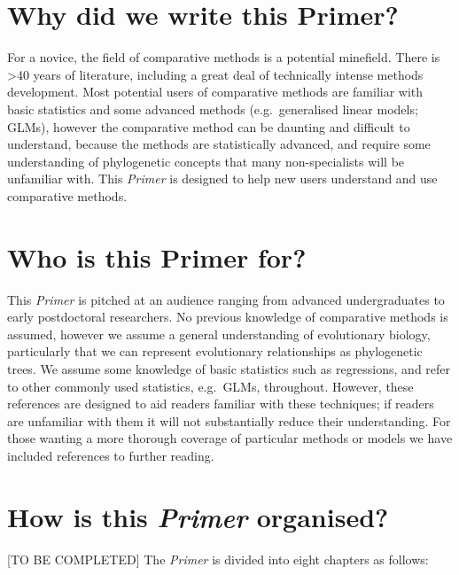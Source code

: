 \documentclass[]{book}
\begin{document}
\section*{Why did we write this
Primer?}\label{why-did-we-write-this-primer}

For a novice, the field of comparative methods is a potential minefield.
There is \textgreater{}40 years of literature, including a great deal of
technically intense methods development. Most potential users of
comparative methods are familiar with basic statistics and some advanced
methods (e.g.~generalised linear models; GLMs), however the comparative
method can be daunting and difficult to understand, because the methods
are statistically advanced, and require some understanding of
phylogenetic concepts that many non-specialists will be unfamiliar with.
This \emph{Primer} is designed to help new users understand and use
comparative methods.

\section*{Who is this Primer for?}\label{who-is-this-primer-for}

This \emph{Primer} is pitched at an audience ranging from advanced
undergraduates to early postdoctoral researchers. No previous knowledge
of comparative methods is assumed, however we assume a general
understanding of evolutionary biology, particularly that we can
represent evolutionary relationships as phylogenetic trees. We assume
some knowledge of basic statistics such as regressions, and refer to
other commonly used statistics, e.g.~GLMs, throughout. However, these
references are designed to aid readers familiar with these techniques;
if readers are unfamiliar with them it will not substantially reduce
their understanding. For those wanting a more thorough coverage of
particular methods or models we have included references to further
reading.

\section*{\texorpdfstring{How is this \emph{Primer}
organised?}{How is this Primer organised?}}\label{how-is-this-primer-organised}

{[}TO BE COMPLETED{]} The \emph{Primer} is divided into eight chapters
as follows:
\end{document}
